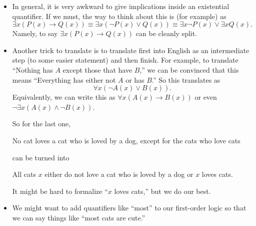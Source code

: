 \begin{itemize}
	\item In general, it is very awkward to give implications inside an existential quantifier. If we must, the way to think about this is (for example) as
	\[\exists x(P(x)\to Q(x))\equiv\exists x(\lnot P(x)\lor Q(x))\equiv\exists x\lnot P(x)\lor\exists xQ(x).\]
	Namely, to say $\exists x(P(x)\to Q(x))$ can be cleanly split.
	\item Another trick to translate is to translate first into English as an intermediate step (to some easier statement) and then finish. For example, to translate ``Nothing has $A$ except those that have $B$,'' we can be convinced that this means ``Everything has either not $A$ or has $B$.'' So this translates as
	\[\forall x(\lnot A(x)\lor B(x)).\]
	Equivalently, we can write this as $\forall x(A(x)\to B(x))$ or even $\lnot\exists x(A(x)\land\lnot B(x))$.

	So for the last one,
	\begin{center}
		No cat loves a cat who is loved by a dog, except for the cats who love cats
	\end{center}
	can be turned into
	\begin{center}
		All cats $x$ either do not love a cat who is loved by a dog or $x$ loves cats.
	\end{center}
	It might be hard to formalize ``$x$ loves cats,'' but we do our best.

	\item We might want to add quantifiers like ``most'' to our first-order logic so that we can say things like ``most cats are cute.''
\end{itemize}